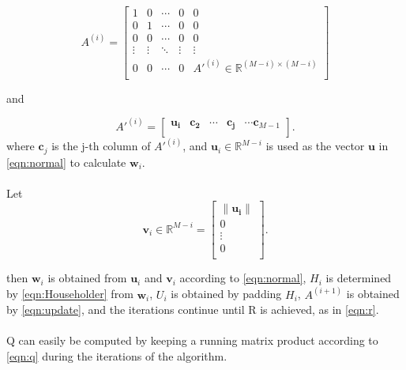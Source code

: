 \documentclass{article}
\begin{document}
\begin{equation}
A^{(i)} =
\begin{bmatrix}
1 & 0 & \cdots & 0  & 0\\
0 & 1  & \cdots & 0 & 0\\
0 & 0 & \cdots & 0 & 0\\
\vdots & \vdots  & \ddots & \vdots & \vdots\\
0 & 0  & \cdots & 0 & A'^{(i)}\in\mathbb{R}^{(M-i)\times{}(M-i)}\\
\end{bmatrix}
\end{equation}

and

\begin{equation}
A'^{(i)} =
\begin{bmatrix}
\mathbf{u_i} & \mathbf{c_2}  & \cdots & \mathbf{c_j} & \cdots \mathbf{c}_{M-1}\\
\end{bmatrix}.
\end{equation}
where $\mathbf{c}_j$ is the j-th column of $A'^{(i)}$, and $\mathbf{u}_i\in\mathbb{R}^{M-i}$ is used as the vector $\mathbf{u}$ in \eqref{eqn:normal} to calculate $\mathbf{w}_{i}$.
\paragraph{}
Let
\begin{equation}
\mathbf{v}_i\in\mathbb{R}^{M-i} = 
\begin{bmatrix}
\|\mathbf{u_i}\| \\
0  \\
\vdots \\
0 \\
\end{bmatrix}.
\end{equation}

then $\mathbf{w}_i$ is obtained from $\mathbf{u}_i$ and $\mathbf{v}_i$ according to \eqref{eqn:normal}, $H_i$ is determined by \eqref{eqn:Householder} from $\mathbf{w}_i$, $U_i$ is obtained by padding $H_i$, $A^{(i+1)}$ is obtained by \eqref{eqn:update}, and the iterations continue until R is achieved, as in \eqref{eqn:r}.

\paragraph{}
Q can easily be computed by keeping a running matrix product according to \eqref{eqn:q} during the iterations of the algorithm.
\end{document}
